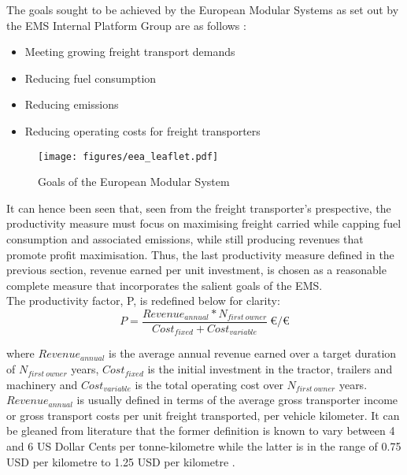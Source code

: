 \documentclass[ExampleMasters.tex]{subfiles}
\begin{document}
		The goals sought to be achieved by the European Modular Systems as set out by the EMS Internal Platform Group are as follows \cite{EMSleaflet}:
		\begin{itemize}
			\item Meeting growing freight transport demands
			\item Reducing fuel consumption
			\item Reducing emissions
			\item Reducing operating costs for freight transporters
		\end{itemize}

		\begin{figure}[h!]
			\centering
			\texttt{[image: figures/eea\_leaflet.pdf]}
			\caption{Goals of the European Modular System \cite{EMSleaflet}}
			\label{EMSleaflet}
		\end{figure}

		It can hence been seen that, seen from the freight transporter's prespective, the productivity measure must focus on maximising freight carried while capping fuel consumption and associated emissions, while still producing revenues that promote profit maximisation. Thus, the last productivity measure defined in the previous section, revenue earned per unit investment, is chosen as a reasonable complete measure that incorporates the salient goals of the EMS.\\ 

		The productivity factor, P, is redefined below for clarity:
		\begin{equation} \label{eq:productivity}
			P = \frac{Revenue_{annual}*N_{first\ owner}}{Cost_{fixed} + Cost_{variable}}\ \euro/\euro
		\end{equation}

		where $Revenue_{annual}$ is the average annual revenue earned over a target duration of $N_{first\ owner}$ years, $Cost_{fixed}$ is the initial investment in the tractor, trailers and machinery and $Cost_{variable}$ is the total operating cost over $N_{first\ owner}$ years.\\

		$Revenue_{annual}$ is usually defined in terms of the average gross transporter income or gross transport costs per unit freight transported, per vehicle kilometer. It can be gleaned from literature that the former definition is known to vary between 4 and 6 US Dollar Cents per tonne-kilometre \cite{WorldBankReport} while the latter is in the range of 0.75 USD per kilometre to 1.25 USD per kilometre \cite{WorldBankReport}.\\
\end{document}
